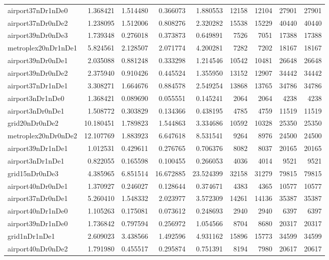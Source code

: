 \begin{longtable}{|l|r|r|r|r|r|r|r|r|}
airport37nDr1nDe0 & 1.368421 & 1.514480 & 0.366073 & 1.880553 & 12158 & 12104 & 27901 & 27901 \\
airport37nDr0nDe2 & 1.238095 & 1.512006 & 0.808276 & 2.320282 & 15538 & 15229 & 40440 & 40440 \\
airport39nDr0nDe3 & 1.739348 & 0.276018 & 0.373873 & 0.649891 & 7526 & 7051 & 17388 & 17388 \\
metroplex20nDr1nDe1 & 5.824561 & 2.128507 & 2.071774 & 4.200281 & 7282 & 7202 & 18167 & 18167 \\
airport39nDr0nDe1 & 2.035088 & 0.881248 & 0.333298 & 1.214546 & 10542 & 10481 & 26648 & 26648 \\
airport39nDr0nDe2 & 2.375940 & 0.910426 & 0.445524 & 1.355950 & 13152 & 12907 & 34442 & 34442 \\
airport37nDr1nDe1 & 3.308271 & 1.664676 & 0.884578 & 2.549254 & 13868 & 13765 & 34786 & 34786 \\
airport3nDr1nDe0 & 1.368421 & 0.089690 & 0.055551 & 0.145241 & 2064 & 2064 & 4238 & 4238 \\
airport3nDr0nDe1 & 1.508772 & 0.303829 & 0.134366 & 0.438195 & 4785 & 4759 & 11519 & 11519 \\
grid20nDr0nDe2 & 10.180451 & 1.789823 & 1.544863 & 3.334686 & 10592 & 10328 & 25350 & 25350 \\
metroplex20nDr0nDe2 & 12.107769 & 1.883923 & 6.647618 & 8.531541 & 9264 & 8976 & 24500 & 24500 \\
airport39nDr1nDe1 & 1.012531 & 0.429611 & 0.276765 & 0.706376 & 8082 & 8037 & 20165 & 20165 \\
airport3nDr1nDe1 & 0.822055 & 0.165598 & 0.100455 & 0.266053 & 4036 & 4014 & 9521 & 9521 \\
grid15nDr0nDe3 & 4.385965 & 6.851514 & 16.672885 & 23.524399 & 32158 & 31279 & 79815 & 79815 \\
airport40nDr0nDe1 & 1.370927 & 0.246027 & 0.128644 & 0.374671 & 4383 & 4365 & 10577 & 10577 \\
airport37nDr0nDe1 & 5.260410 & 1.548332 & 2.023977 & 3.572309 & 14261 & 14136 & 35387 & 35387 \\
airport40nDr1nDe0 & 1.105263 & 0.175081 & 0.073612 & 0.248693 & 2940 & 2940 & 6397 & 6397 \\
airport39nDr1nDe0 & 1.736842 & 0.797594 & 0.256972 & 1.054566 & 8704 & 8680 & 20317 & 20317 \\
grid1nDr1nDe1 & 2.609023 & 3.438566 & 1.492596 & 4.931162 & 15896 & 15773 & 34599 & 34599 \\
airport40nDr0nDe2 & 1.791980 & 0.455517 & 0.295874 & 0.751391 & 8194 & 7980 & 20617 & 20617 \\

\end{longtable}
